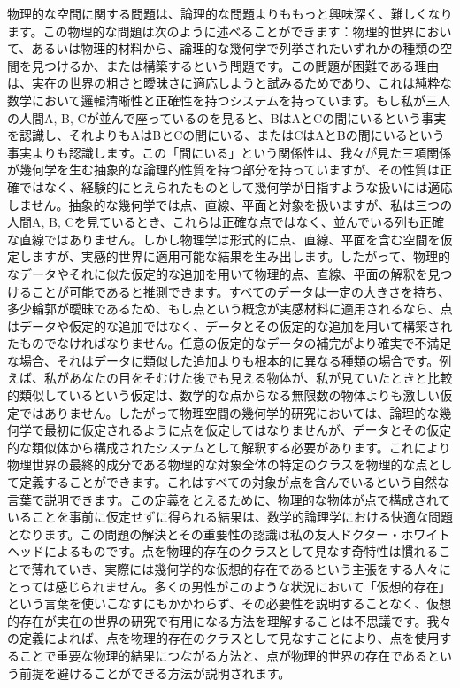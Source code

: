 \documentclass[a4paper,11pt,openany]{ltjsbook}
\begin{document}
物理的な空間に関する問題は、論理的な問題よりももっと興味深く、難しくなります。この物理的な問題は次のように述べることができます：物理的世界において、あるいは物理的材料から、論理的な幾何学で列挙されたいずれかの種類の空間を見つけるか、または構築するという問題です。この問題が困難である理由は、実在の世界の粗さと曖昧さに適応しようと試みるためであり、これは純粋な数学において邏輯清晰性と正確性を持つシステムを持っています。もし私が三人の人間A, B, Cが並んで座っているのを見ると、BはAとCの間にいるという事実を認識し、それよりもAはBとCの間にいる、またはCはAとBの間にいるという事実よりも認識します。この「間にいる」という関係性は、我々が見た三項関係が幾何学を生む抽象的な論理的性質を持つ部分を持っていますが、その性質は正確ではなく、経験的にとえられたものとして幾何学が目指すような扱いには適応しません。抽象的な幾何学では点、直線、平面と対象を扱いますが、私は三つの人間A, B, Cを見ているとき、これらは正確な点ではなく、並んでいる列も正確な直線ではありません。しかし物理学は形式的に点、直線、平面を含む空間を仮定しますが、実感的世界に適用可能な結果を生み出します。したがって、物理的なデータやそれに似た仮定的な追加を用いて物理的点、直線、平面の解釈を見つけることが可能であると推測できます。すべてのデータは一定の大きさを持ち、多少輪郭が曖昧であるため、もし点という概念が実感材料に適用されるなら、点はデータや仮定的な追加ではなく、データとその仮定的な追加を用いて構築されたものでなければなりません。任意の仮定的なデータの補完がより確実で不満足な場合、それはデータに類似した追加よりも根本的に異なる種類の場合です。例えば、私があなたの目をそむけた後でも見える物体が、私が見ていたときと比較的類似しているという仮定は、数学的な点からなる無限数の物体よりも激しい仮定ではありません。したがって物理空間の幾何学的研究においては、論理的な幾何学で最初に仮定されるように点を仮定してはなりませんが、データとその仮定的な類似体から構成されたシステムとして解釈する必要があります。これにより物理世界の最終的成分である物理的な対象全体の特定のクラスを物理的な点として定義することができます。これはすべての対象が点を含んでいるという自然な言葉で説明できます。この定義をとえるために、物理的な物体が点で構成されていることを事前に仮定せずに得られる結果は、数学的論理学における快適な問題となります。この問題の解決とその重要性の認識は私の友人ドクター・ホワイトヘッドによるものです。点を物理的存在のクラスとして見なす奇特性は慣れることで薄れていき、実際には幾何学的な仮想的存在であるという主張をする人々にとっては感じられません。多くの男性がこのような状況において「仮想的存在」という言葉を使いこなすにもかかわらず、その必要性を説明することなく、仮想的存在が実在の世界の研究で有用になる方法を理解することは不思議です。我々の定義によれば、点を物理的存在のクラスとして見なすことにより、点を使用することで重要な物理的結果につながる方法と、点が物理的世界の存在であるという前提を避けることができる方法が説明されます。
\end{document}
